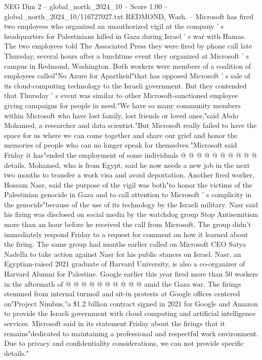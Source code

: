 \begin{textsample}{NEG Dim 2 – global\_north\_2024\_10 – Score 1.00 – global\_north\_2024\_10/116727027.txt}  \label{ex:f2_neg_102}
REDMOND, Wash. -- Microsoft has fired two employees who organized an unauthorized vigil at the company ' s headquarters for Palestinians killed in Gaza during Israel ' s war with Hamas.
The two employees told The Associated Press they were fired by phone call late Thursday, several hours after a lunchtime event they organized at Microsoft ' s campus in Redmond, Washington.
Both workers were members of a coalition of employees called"No Azure for Apartheid"that has opposed Microsoft ' s sale of its cloud-computing technology to the Israeli government.
But they contended that Thursday ' s event was similar to other Microsoft-sanctioned employee giving campaigns for people in need."We have so many community members within Microsoft who have lost family, lost friends or loved ones,"said Abdo Mohamed, a researcher and data scientist."But Microsoft really failed to have the space for us where we can come together and share our grief and honor the memories of people who can no longer speak for themselves."Microsoft said Friday it has"ended the employment of some individuals @ @ @ @ @ @ @ @ @ @ details.
Mohamed, who is from Egypt, said he now needs a new job in the next two months to transfer a work visa and avoid deportation.
Another fired worker, Hossam Nasr, said the purpose of the vigil was both"to honor the victims of the Palestinian genocide in Gaza and to call attention to Microsoft ' s complicity in the genocide"because of the use of its technology by the Israeli military.
Nasr said his firing was disclosed on social media by the watchdog group Stop Antisemitism more than an hour before he received the call from Microsoft.
The group didn't immediately respond Friday to a request for comment on how it learned about the firing.
The same group had months earlier called on Microsoft CEO Satya Nadella to take action against Nasr for his public stances on Israel.
Nasr, an Egyptian-raised 2021 graduate of Harvard University, is also a co-organizer of Harvard Alumni for Palestine.
Google earlier this year fired more than 50 workers in the aftermath of @ @ @ @ @ @ @ @ @ @ amid the Gaza war.
The firings stemmed from internal turmoil and sit-in protests at Google offices centered on"Project Nimbus,"a \$1.2 billion contract signed in 2021 for Google and Amazon to provide the Israeli government with cloud computing and artificial intelligence services.
Microsoft said in its statement Friday about the firings that it remains"dedicated to maintaining a professional and respectful work environment.
Due to privacy and confidentiality considerations, we can not provide specific details."

\end{textsample}

